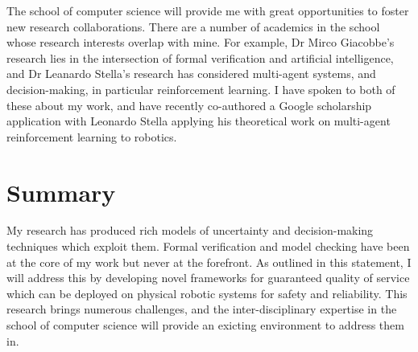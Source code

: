 \documentclass[12pt]{article}
\begin{document}
The school of computer science will provide me with great opportunities to foster new research collaborations.
%
There are a number of academics in the school whose research interests overlap with mine.
%
For example, Dr Mirco Giacobbe's research lies in the intersection of formal verification and artificial intelligence, and Dr Leanardo Stella's research has considered multi-agent systems, and decision-making, in particular reinforcement learning.
%
I have spoken to both of these about my work, and have recently co-authored a Google scholarship application with Leonardo Stella applying his theoretical work on multi-agent reinforcement learning to robotics.


\section*{Summary}

My research has produced rich models of uncertainty and decision-making techniques which exploit them.
%
Formal verification and model checking have been at the core of my work but never at the forefront.
%
As outlined in this statement, I will address this by developing novel frameworks for guaranteed quality of service which can be deployed on physical robotic systems for safety and reliability.
%
This research brings numerous challenges, and the inter-disciplinary expertise in the school of computer science will provide an exicting environment to address them in.
\end{document}

